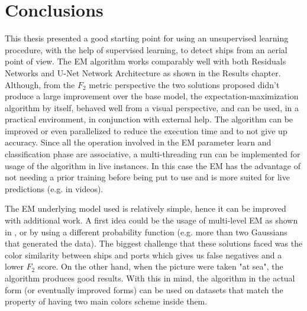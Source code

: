 \chapter{Conclusions}
\label{Conclusions}
This thesis presented a good starting point for using an unsupervised learning procedure, with the help of supervised learning, to detect ships from an aerial point of view. The EM algorithm works comparably well with both Residuals Networks and U-Net Network Architecture as shown in the Results chapter. Although, from the $F_2$ metric perspective the two solutions proposed didn't produce a large improvement over the base model, the expectation-maximization algorithm by itself, behaved well from a visual perspective, and can be used, in a practical environment, in conjunction with external help. The algorithm can be improved or even parallelized to reduce the execution time and to not give up accuracy. Since all the operation involved in the EM parameter learn and classification phase are associative, a multi-threading run can be implemented for usage of the algorithm in live instances. In this case the EM has the advantage of not needing a prior training before being put to use and is more suited for live predictions (e.g. in videos).

The EM underlying model used is relatively simple, hence it can be improved with additional work. A first idea could be the usage of multi-level EM as shown in \cite{EMObjectConcealement}, or by using a different probability function (e.g. more than two Gaussians that generated the data). The biggest challenge that these solutions faced was the color similarity between ships and ports which gives us false negatives and a lower $F_2$ score. On the other hand, when the picture were taken "at sea", the algorithm produces good results. With this in mind, the algorithm in the actual form (or eventually improved forms) can be used on datasets that match the property of having two main colors scheme inside them.

